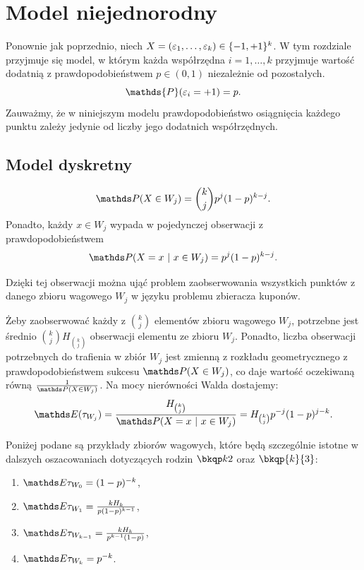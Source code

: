 \section{Model niejednorodny}\label{sec:funny}

\noindent
Ponownie jak poprzednio, niech $X=(\varepsilon_1,\ldots,\varepsilon_k)\in\{-1,+1\}^k$. W tym rozdziale przyjmuje się model, w którym każda współrzędna $i=1,\ldots,k$ przyjmuje wartość dodatnią z prawdopodobieństwem $p\in(0, 1)$ niezależnie od pozostałych.
$$
\mathds{P}(\vareps_i = +1) = p.
$$
\noindent
Zauważmy, że w niniejszym modelu prawdopodobieństwo osiągnięcia każdego punktu zależy jedynie od liczby jego dodatnich współrzędnych.
\subsection{Model dyskretny}
\begin{corollary}
$$
\PP(X\in W_j) = \binom{k}{j} p^j (1-p)^{k-j}.
$$
Ponadto, każdy $x\in W_j$ wypada w pojedynczej obserwacji z prawdopodobieństwem
$$
\PP(X=x\ |\
 x\in W_j) = p^j (1-p)^{k-j}.
$$
\end{corollary}

\noindent
Dzięki tej obserwacji można ująć problem zaobserwowania wszystkich punktów z danego zbioru wagowego $W_j$ w języku problemu zbieracza kuponów. 

\begin{example}
Żeby zaobserwować każdy z $\binom{k}{j}$ elementów zbioru wagowego $W_j$, potrzebne jest średnio $\binom{k}{j} H_{\binom{k}{j}}$ obserwacji elementu ze zbioru $W_j$. Ponadto, liczba obserwacji potrzebnych do trafienia w zbiór $W_j$ jest zmienną z rozkładu geometrycznego z prawdopodobieństwem sukcesu $\PP(X\in W_j)$, co daje wartość oczekiwaną równą $\frac{1}{\PP(X\in W_j)}$. Na mocy nierówności Walda dostajemy: 
$$
\EE(\tau_{W_j}) = \frac{H_{\binom{k}{j}}}{\PP(X=x\ |\
 x\in W_j)} = H_{\binom{k}{j}}p^{-j}(1-p)^{j-k}.
$$   
\end{example}

\noindent
Poniżej podane są przykłady zbiorów wagowych, które będą szczególnie istotne w dalszych oszacowaniach dotyczących rodzin $\ising$ oraz $\bkqp{k}{3}$:

\begin{corollary}
\leavevmode
\makeatletter
\@nobreaktrue
\makeatother
\begin{enumerate}
    \item $\EE \tau_{W_0} = (1-p)^{-k}$,
    \item $\EE \tau_{W_1} = \frac{kH_k}{p(1-p)^{k-1}}$,
    \item $\EE \tau_{W_{k-1}} = \frac{kH_k}{p^{k-1}(1-p)}$,
    \item $\EE \tau_{W_k} = p^{-k}$.    
\end{enumerate}
\end{corollary}

